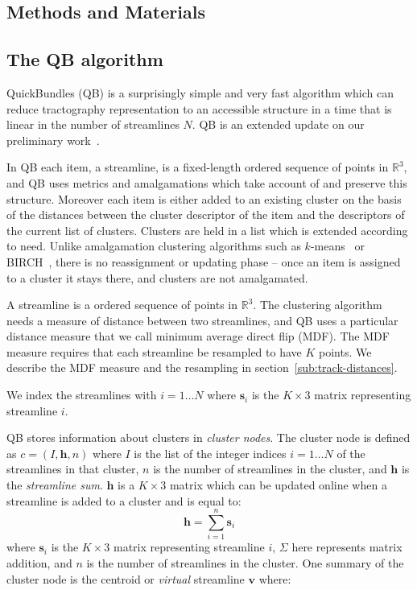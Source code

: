 \documentclass{bioinfo}
\begin{document}
\begin{methods}

\section{Methods and Materials}

\subsection{The QB algorithm\label{sub:QB-description}}

QuickBundles (QB) is a surprisingly simple and very fast algorithm which
can reduce tractography representation to an accessible structure in a
time that is linear in the number of streamlines $N$. QB is an extended
update on our preliminary work~\citet{EGMB10}.

In QB each item, a streamline, is a fixed-length ordered sequence of
points in $\mathbb{R}^{3}$, and QB uses metrics and amalgamations which
take account of and preserve this structure.  Moreover each item is
either added to an existing cluster on the basis of the distances
between the cluster descriptor of the item and the descriptors of the
current list of clusters. Clusters are held in a list which is extended
according to need. Unlike amalgamation clustering algorithms such as
$k$-means~\citep{steinhaus1956division, macqueen1967some} or
BIRCH~\citep{zhang1997birch}, there is no reassignment or updating phase
-- once an item is assigned to a cluster it stays there, and clusters
are not amalgamated.

A streamline is a ordered sequence of points in $\mathbb{R}^{3}$.  The
clustering algorithm needs a measure of distance between two
streamlines, and QB uses a particular distance measure that we call
minimum average direct flip (MDF).  The MDF measure requires that each
streamline be resampled to have $K$ points. We describe the MDF measure
and the resampling in section~\ref{sub:track-distances}.

We index the streamlines with $i = 1 \dots N$ where $\mathbf{s}_{i}$ is
the $K\times3$ matrix representing streamline $i$.

QB stores information about clusters in \emph{cluster nodes}.  The
cluster node is defined as $c=(I,\mathbf{h},n)$ where $I$ is the list of
the integer indices $i = 1 \dots N$ of the streamlines in that cluster,
$n$ is the number of streamlines in the cluster, and $\mathbf{h}$ is the
\emph{streamline sum}. $\mathbf{h}$ is a $K \times3$ matrix which can be
updated online when a streamline is added to a cluster and is equal to:
\begin{equation}
  \mathbf{h}=\sum_{i=1}^{n}\mathbf{s}_{i}
\end{equation} 
where $\mathbf{s}_{i}$ is the $K\times3$ matrix representing streamline $i$,
$\Sigma$ here represents matrix addition, and $n$ is the number of
streamlines in the cluster. One summary of the cluster node is the centroid or
\emph{virtual} streamline $\mathbf{v}$ where:


\end{methods}
\end{document}

